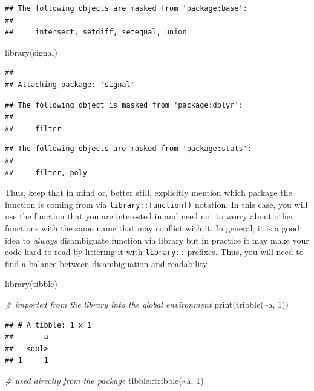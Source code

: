 \documentclass[
]{book}
\newenvironment{Shaded}{\begin{snugshade}}{\end{snugshade}}
\newcommand{\CommentTok}[1]{\textcolor[rgb]{0.56,0.35,0.01}{\textit{#1}}}
\newcommand{\DecValTok}[1]{\textcolor[rgb]{0.00,0.00,0.81}{#1}}
\newcommand{\FunctionTok}[1]{\textcolor[rgb]{0.00,0.00,0.00}{#1}}
\newcommand{\NormalTok}[1]{#1}
\newcommand{\SpecialCharTok}[1]{\textcolor[rgb]{0.00,0.00,0.00}{#1}}
\begin{document}
\begin{verbatim}
## The following objects are masked from 'package:base':
## 
##     intersect, setdiff, setequal, union
\end{verbatim}

\begin{Shaded}
\begin{Highlighting}[]
\FunctionTok{library}\NormalTok{(signal)}
\end{Highlighting}
\end{Shaded}

\begin{verbatim}
## 
## Attaching package: 'signal'
\end{verbatim}

\begin{verbatim}
## The following object is masked from 'package:dplyr':
## 
##     filter
\end{verbatim}

\begin{verbatim}
## The following objects are masked from 'package:stats':
## 
##     filter, poly
\end{verbatim}

Thus, keep that in mind or, better still, explicitly mention which package the function is coming from via \texttt{library::function()} notation. In this case, you will use the function that you are interested in and need not to worry about other functions with the same name that may conflict with it. In general, it is a good idea to \emph{always} disambiguate function via library but in practice it may make your code hard to read by littering it with \texttt{library::} prefixes. Thus, you will need to find a balance between disambiguation and readability.

\begin{Shaded}
\begin{Highlighting}[]
\FunctionTok{library}\NormalTok{(tibble)}

\CommentTok{\# imported from the library into the global environment}
\FunctionTok{print}\NormalTok{(}\FunctionTok{tribble}\NormalTok{(}\SpecialCharTok{\textasciitilde{}}\NormalTok{a, }\DecValTok{1}\NormalTok{))}
\end{Highlighting}
\end{Shaded}

\begin{verbatim}
## # A tibble: 1 x 1
##       a
##   <dbl>
## 1     1
\end{verbatim}

\begin{Shaded}
\begin{Highlighting}[]
\CommentTok{\# used directly from the package}
\NormalTok{tibble}\SpecialCharTok{::}\FunctionTok{tribble}\NormalTok{(}\SpecialCharTok{\textasciitilde{}}\NormalTok{a, }\DecValTok{1}\NormalTok{)}
\end{Highlighting}
\end{Shaded}
\end{document}
